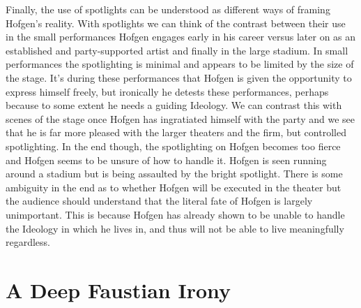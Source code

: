\documentclass[a4paper, 11pt]{article} %
\begin{document}
Finally, the use of spotlights can be understood as different ways of framing Hofgen's reality.  With spotlights we can think of the contrast between their use in the small performances Hofgen engages early in his career versus later on as an established and party-supported artist and finally in the large stadium.  In small performances the spotlighting is minimal and appears to be limited by the size of the stage.  It's during these performances that Hofgen is given the opportunity to express himself freely, but ironically he detests these performances, perhaps because to some extent he needs a guiding Ideology.  We can contrast this with scenes of the stage once Hofgen has ingratiated himself with the party and we see that he is far more pleased with the larger theaters and the firm, but controlled spotlighting.  In the end though, the spotlighting on Hofgen becomes too fierce and Hofgen seems to be unsure of how to handle it.  Hofgen is seen running around a stadium but is being assaulted by the bright spotlight.  There is some ambiguity in the end as to whether Hofgen will be executed in the theater but the audience should understand that the literal fate of Hofgen is largely unimportant.  This is because Hofgen has already shown to be unable to handle the Ideology in which he lives in, and thus will not be able to live meaningfully regardless.  


\section*{A Deep Faustian Irony}
\end{document}
